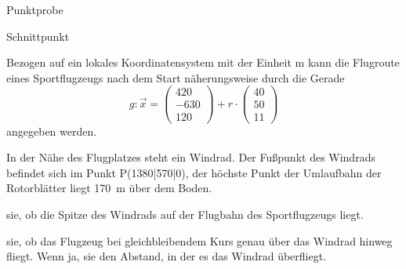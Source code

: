 \documentclass[11pt, a5paper, landscape]{scrartcl}
\begin{document}
	\begin{center}
		\begin{multicols}{2}
			Punktprobe \\
			\columnbreak
			
			Schnittpunkt \\
		\end{multicols}
	\end{center}
	\clearpage
	
	\begin{aufgabe}
		Bezogen auf ein lokales Koordinatensystem mit der Einheit \si{\meter} kann die Flugroute eines Sportflugzeugs nach dem Start näherungsweise durch die Gerade
		\[ g: \vec{x} = \begin{pmatrix} 420 \\ -630 \\ 120 \end{pmatrix} + r\cdot \begin{pmatrix} 40 \\ 50 \\ 11 \end{pmatrix}\]
		angegeben werden.
		
		In der Nähe des Flugplatzes steht ein Windrad. Der Fußpunkt des Windrads befindet sich im Punkt P\pkt(1380|570|0), der höchste Punkt der Umlaufbahn der Rotorblätter liegt \SI{170}{\meter} über dem Boden.
		
		\begin{teilaufgaben}
			\teilaufgabe {} sie, ob die Spitze des Windrads auf der Flugbahn des Sportflugzeugs liegt.
		 
			\teilaufgabe {} sie, ob das Flugzeug bei gleichbleibendem Kurs genau über das Windrad hinweg fliegt. Wenn ja,  sie den Abstand, in der es das Windrad überfliegt.
		\end{teilaufgaben}
	\end{aufgabe}
	\clearpage
	
\end{document}

